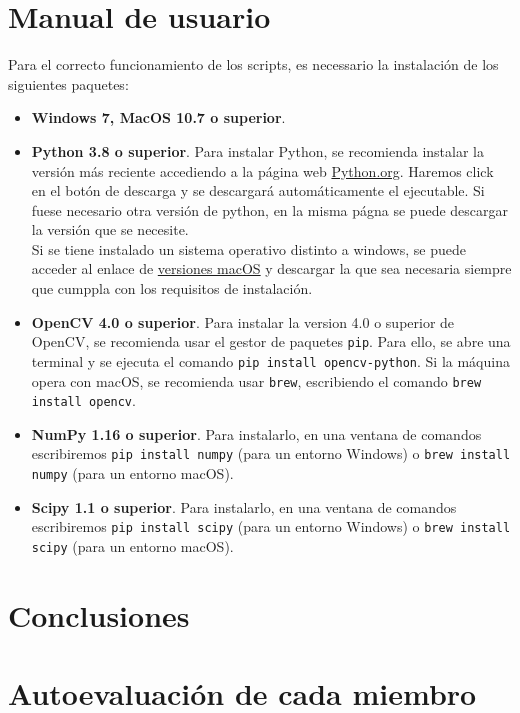 \documentclass[a4paper]{article}
\begin{document}
\section{Manual de usuario}

Para el correcto funcionamiento de los scripts, es necessario la instalación de los siguientes paquetes:

\begin{itemize}
    \item \textbf{Windows 7, MacOS 10.7 o superior}.
    \item \textbf{Python 3.8 o superior}. Para instalar Python, se recomienda instalar la versión más reciente accediendo a la página web \href{https://www.python.org/downloads/}{Python.org}. Haremos click en el botón de descarga y se descargará automáticamente el ejecutable. Si fuese necesario otra versión de python, en la misma págna se puede descargar la versión que se necesite.\\
    Si se tiene instalado un sistema operativo distinto a windows, se puede acceder al enlace de \href{https://www.python.org/downloads/macos/}{versiones macOS} y descargar la que sea necesaria siempre que cumppla con los requisitos de instalación.
    \item \textbf{OpenCV 4.0 o superior}. Para instalar la version 4.0 o superior de OpenCV, se recomienda usar el gestor de paquetes \texttt{pip}. Para ello, se abre una terminal y se ejecuta el comando \texttt{pip install opencv-python}. Si la máquina opera con macOS, se recomienda usar \texttt{brew}, escribiendo el comando \texttt{brew install opencv}.
    \item \textbf{NumPy 1.16 o superior}. Para instalarlo, en una ventana de comandos escribiremos \texttt{pip install numpy} (para un entorno Windows) o \texttt{brew install numpy} (para un entorno macOS).
    \item \textbf{Scipy 1.1 o superior}. Para instalarlo, en una ventana de comandos escribiremos \texttt{pip install scipy} (para un entorno Windows) o \texttt{brew install scipy} (para un entorno macOS).
\end{itemize}

\section{Conclusiones}

\section{Autoevaluación de cada miembro}
\end{document}
